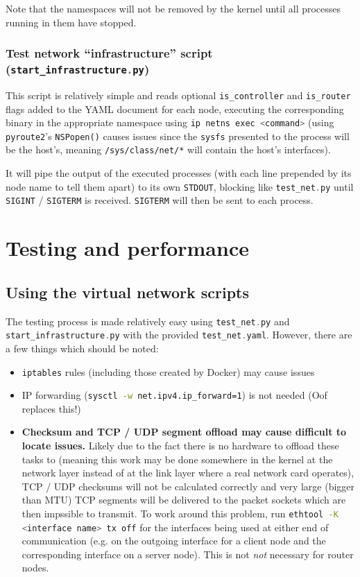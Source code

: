 \documentclass[a4paper]{article}
\numberwithin{figure}{section}
\numberwithin{table}{section}
\newcommand{\mi}{\mintinline}
\begin{document}
\medskip
\noindent Note that the namespaces will not be removed by the kernel until all processes running in them have stopped.

\subsubsection{Test network ``infrastructure'' script (\mi{c}{start_infrastructure.py})}
This script is relatively simple and reads optional \mi{c}{is_controller} and \mi{c}{is_router} flags added to the YAML document for each node, executing the corresponding binary in the appropriate namespace using \mi{c}{ip netns exec <command>} (using \mi{c}{pyroute2}'s \mi{python}{NSPopen()} causes issues since the \mi{c}{sysfs} presented to the process will be the host's, meaning \mi{bash}{/sys/class/net/*} will contain the host's interfaces).

It will pipe the output of the executed processes (with each line prepended by its node name to tell them apart) to its own \mi{c}{STDOUT}, blocking like \mi{c}{test_net.py} until \mi{c}{SIGINT} / \mi{c}{SIGTERM} is received. \mi{c}{SIGTERM} will then be sent to each process.

\section{Testing and performance}
\subsection{Using the virtual network scripts}
The testing process is made relatively easy using \mi{c}{test_net.py} and \mi{c}{start_infrastructure.py} with the provided \mi{c}{test_net.yaml}. However, there are a few things which should be noted:
\begin{itemize}
	\item \mi{c}{iptables} rules (including those created by Docker) may cause issues
	\item IP forwarding (\mi{bash}{sysctl -w net.ipv4.ip_forward=1}) is not needed (Oof replaces this!)
	\item \textbf{Checksum and TCP / UDP segment offload may cause difficult to locate issues.} Likely due to the fact there is no hardware to offload these tasks to (meaning this work may be done somewhere in the kernel at the network layer instead of at the link layer where a real network card operates), TCP / UDP checksums will not be calculated correctly and very large (bigger than MTU) TCP segments will be delivered to the packet sockets which are then impssible to transmit. To work around this problem, run \mi{bash}{ethtool -K <interface name> tx off} for the interfaces being used at either end of communication (e.g. on the outgoing interface for a client node and the corresponding interface on a server node). This is not \textit{not} necessary for router nodes.
\end{itemize}
\end{document}
